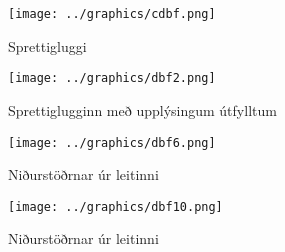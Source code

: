 \documentclass[12pt, git, final]{rureport}
\begin{document}
\begin{figure}
	\centering 
	\texttt{[image: ../graphics/cdbf.png]}
	\caption{Sprettigluggi \label{fig:cdbf}}
\end{figure}

\begin{figure}
	\centering 
	\texttt{[image: ../graphics/dbf2.png]}
	\caption{Sprettiglugginn með upplýsingum útfylltum \label{fig:dbf2}}
\end{figure}


\begin{figure}
	\centering 
	\texttt{[image: ../graphics/dbf6.png]}
	\caption{Niðurstöðrnar úr leitinni\label{fig:dbf6}}
\end{figure}

\begin{figure}
	\centering 
	\texttt{[image: ../graphics/dbf10.png]}
	\caption{Niðurstöðrnar úr leitinni\label{fig:dbf10}}
\end{figure}

\clearpage
\printbibliography
\end{document}
